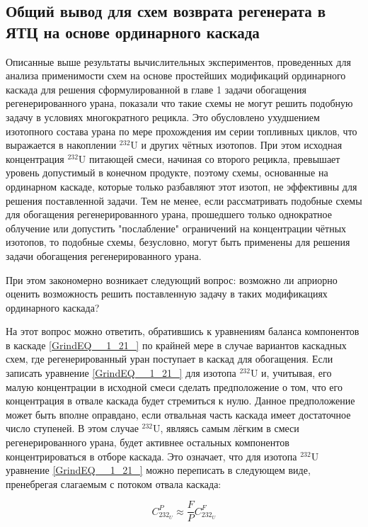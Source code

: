 \subsection{Общий вывод для схем возврата регенерата в ЯТЦ на основе ординарного каскада}

Описанные выше результаты вычислительных экспериментов, проведенных для анализа применимости схем на основе простейших модификаций ординарного каскада для решения сформулированной в главе 1 задачи обогащения регенерированного урана, показали что такие схемы не могут решить подобную задачу в условиях  многократного рецикла. Это обусловлено ухудшением изотопного состава урана по мере прохождения им серии топливных циклов, что выражается в накоплении $^{232}$U и других чётных изотопов. При этом исходная концентрация $^{232}$U питающей смеси, начиная со второго рецикла, превышает уровень допустимый в конечном продукте, поэтому схемы, основанные на ординарном каскаде, которые только разбавляют этот изотоп, не эффективны для решения поставленной задачи. Тем не менее, если рассматривать подобные схемы для обогащения регенерированного урана, прошедшего только однократное облучение или допустить "послабление" ограничений на концентрации чётных изотопов, то подобные схемы, безусловно, могут быть применены для решения задачи обогащения регенерированного урана.

При этом закономерно возникает следующий вопрос: возможно ли априорно оценить возможность решить поставленную задачу в таких модификациях ординарного каскада? 

На этот вопрос можно ответить, обратившись к уравнениям баланса компонентов в каскаде \ref{GrindEQ__1_21_} по крайней мере в случае вариантов каскадных схем, где регенерированный уран поступает в каскад для обогащения. Если записать уравнение \ref{GrindEQ__1_21_} для изотопа $^{232}$U и, учитывая, его малую концентрации в исходной смеси сделать предположение о том, что его концентрация в отвале каскада будет стремиться к нулю. Данное предположение может быть вполне оправдано, если отвальная часть каскада имеет достаточное число ступеней. В этом случае $^{232}$U, являясь самым лёгким в смеси регенерированного урана, будет активнее остальных компонентов концентрироваться в отборе каскада. Это означает, что для изотопа $^{232}$U уравнение \ref{GrindEQ__1_21_} можно переписать в следующем виде, пренебрегая слагаемым с потоком отвала каскада:

\begin{equation}
\label{eq_232_balance}
  C_{232_{U}}^{P} \approx \frac{F}{P} C_{232_{U}}^{F}
\end{equation}


